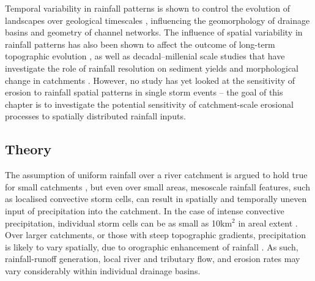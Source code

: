 Temporal variability in rainfall patterns is shown to control the evolution of landscapes over geological timescales \citep{Tucker2000,Solyom2004}, influencing the geomorphology of drainage basins and geometry of channel networks. The influence of spatial variability in rainfall patterns has also been shown to affect the outcome of long-term topographic evolution \citep{solyom2007importance,Han2014}, as well as decadal--millenial scale studies that have investigate the role of rainfall resolution on sediment yields and morphological change in catchments \citep{coulthard2016sensitivity}. However, no study has yet looked at the sensitivity of erosion to rainfall spatial patterns in single storm events -- the goal of this chapter is to investigate the potential sensitivity of catchment-scale erosional processes to spatially distributed rainfall inputs.

%

\subsection{Theory}
The assumption of uniform rainfall over a river catchment is argued to hold true for small catchments \citep{Solyom2004,Tucker2010}, but even over small areas, mesoscale rainfall features, such as localised convective storm cells, can result in spatially and temporally uneven input of precipitation into the catchment. In the case of intense convective precipitation, individual storm cells can be as small as 10km$^2$ in areal extent  \citep{weisman1986characteristics,vonhardenberg2003shape}. Over larger catchments, or those with steep topographic gradients, precipitation is likely to vary spatially, due to orographic enhancement of rainfall \citep{Roe2003}. As such, rainfall-runoff generation, local river and tributary flow, and erosion rates may vary considerably within individual drainage basins. 

